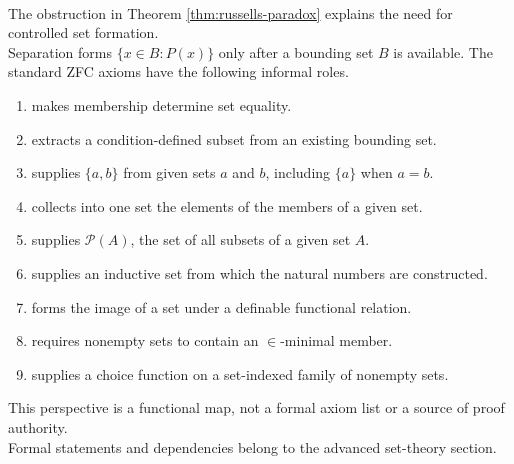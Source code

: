 \begin{perspective} \label{per:zfc-axiom-role-map} \\
The obstruction in Theorem \ref{thm:russells-paradox} explains the need for controlled set formation.\\
Separation forms $\{x\in B:P(x)\}$ only after a bounding set $B$ is available.
The standard ZFC axioms have the following informal roles.
\begin{enumerate}[label=(\roman*)]
\setlength{\itemsep}{0pt}
\item {} makes membership determine set equality.
\item {} extracts a condition-defined subset from an existing bounding set.
\item {} supplies $\{a,b\}$ from given sets $a$ and $b$, including $\{a\}$ when $a=b$.
\item {} collects into one set the elements of the members of a given set.
\item {} supplies $\mathcal{P}(A)$, the set of all subsets of a given set $A$.
\item {} supplies an inductive set from which the natural numbers are constructed.
\item {} forms the image of a set under a definable functional relation.
\item {} requires nonempty sets to contain an $\in$-minimal member.
\item {} supplies a choice function on a set-indexed family of nonempty sets.
\end{enumerate}
This perspective is a functional map, not a formal axiom list or a source of proof authority.\\
Formal statements and dependencies belong to the advanced set-theory section.
\end{perspective}
